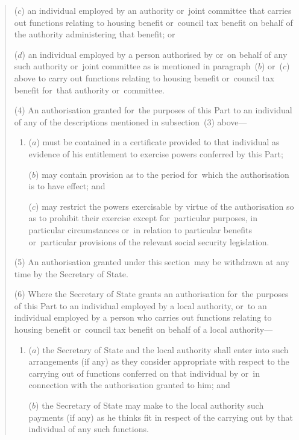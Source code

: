 \documentclass[12pt,a4paper]{article}
\begin{document}
\begin{quotation}
\begin{enumerate}
($c$) an individual employed by an authority or~joint committee that carries out functions relating to housing benefit or~council tax benefit on behalf of the authority administering that benefit; or

($d$) an individual employed by a person authorised by or~on behalf of any such authority or~joint committee as is mentioned in paragraph~($b$)  or~($c$)  above to carry out functions relating to housing benefit or~council tax benefit for~that authority or~committee.
\end{enumerate}

(4) An authorisation granted for~the purposes of this Part to an individual of any of the descriptions mentioned in subsection~(3)  above—
\begin{enumerate}\item[]
($a$) must be contained in a certificate provided to that individual as evidence of his entitlement to exercise powers conferred by this Part;

($b$) may contain provision as to the period for~which the authorisation is to have effect; and

($c$) may restrict the powers exercisable by virtue of the authorisation so as to prohibit their exercise except for~particular purposes, in particular circumstances or~in relation to particular benefits or~particular provisions of the relevant social security legislation.
\end{enumerate}

(5) An authorisation granted under this section~may be withdrawn at any time by the Secretary of State.

(6) Where the Secretary of State grants an authorisation for~the purposes of this Part to an individual employed by a local authority, or~to an individual employed by a person who carries out functions relating to housing benefit or~council tax benefit on behalf of a local authority—
\begin{enumerate}\item[]
($a$) the Secretary of State and the local authority shall enter into such arrangements (if any) as they consider appropriate with respect to the carrying out of functions conferred on that individual by or~in connection with the authorisation granted to him; and

($b$) the Secretary of State may make to the local authority such payments (if any) as he thinks fit in respect of the carrying out by that individual of any such functions.
\end{enumerate}


\end{quotation}
\end{document}
